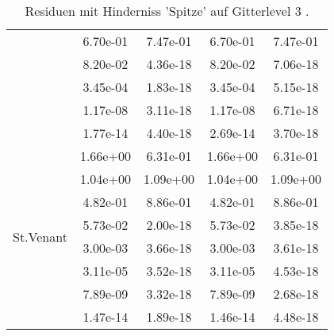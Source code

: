 \begin{table}
\begin{tabular}{c|cc|cc|}
\multicolumn{1}{|c|}{} & \multicolumn{1}{|c|}{  6.70e-01} & \multicolumn{1}{|c|}{  7.47e-01} & \multicolumn{1}{|c|}{  6.70e-01} & \multicolumn{1}{|c|}{  7.47e-01} \\ 
\multicolumn{1}{|c|}{} & \multicolumn{1}{|c|}{  8.20e-02} & \multicolumn{1}{|c|}{  4.36e-18} & \multicolumn{1}{|c|}{  8.20e-02} & \multicolumn{1}{|c|}{  7.06e-18} \\ 
\multicolumn{1}{|c|}{} & \multicolumn{1}{|c|}{  3.45e-04} & \multicolumn{1}{|c|}{  1.83e-18} & \multicolumn{1}{|c|}{  3.45e-04} & \multicolumn{1}{|c|}{  5.15e-18} \\ 
\multicolumn{1}{|c|}{} & \multicolumn{1}{|c|}{  1.17e-08} & \multicolumn{1}{|c|}{  3.11e-18} & \multicolumn{1}{|c|}{  1.17e-08} & \multicolumn{1}{|c|}{  6.71e-18} \\ 
\multicolumn{1}{|c|}{} & \multicolumn{1}{|c|}{  1.77e-14} & \multicolumn{1}{|c|}{  4.40e-18} & \multicolumn{1}{|c|}{  2.69e-14} & \multicolumn{1}{|c|}{  3.70e-18} \\ 
\hline 
\multicolumn{1}{|c|}{\multirow{8}{*}{St.Venant}} &\multicolumn{1}{|c|}{  1.66e+00} & \multicolumn{1}{|c|}{  6.31e-01} & \multicolumn{1}{|c|}{  1.66e+00} & \multicolumn{1}{|c|}{  6.31e-01} \\ 
\multicolumn{1}{|c|}{} & \multicolumn{1}{|c|}{  1.04e+00} & \multicolumn{1}{|c|}{  1.09e+00} & \multicolumn{1}{|c|}{  1.04e+00} & \multicolumn{1}{|c|}{  1.09e+00} \\ 
\multicolumn{1}{|c|}{} & \multicolumn{1}{|c|}{  4.82e-01} & \multicolumn{1}{|c|}{  8.86e-01} & \multicolumn{1}{|c|}{  4.82e-01} & \multicolumn{1}{|c|}{  8.86e-01} \\ 
\multicolumn{1}{|c|}{} & \multicolumn{1}{|c|}{  5.73e-02} & \multicolumn{1}{|c|}{  2.00e-18} & \multicolumn{1}{|c|}{  5.73e-02} & \multicolumn{1}{|c|}{  3.85e-18} \\ 
\multicolumn{1}{|c|}{} & \multicolumn{1}{|c|}{  3.00e-03} & \multicolumn{1}{|c|}{  3.66e-18} & \multicolumn{1}{|c|}{  3.00e-03} & \multicolumn{1}{|c|}{  3.61e-18} \\ 
\multicolumn{1}{|c|}{} & \multicolumn{1}{|c|}{  3.11e-05} & \multicolumn{1}{|c|}{  3.52e-18} & \multicolumn{1}{|c|}{  3.11e-05} & \multicolumn{1}{|c|}{  4.53e-18} \\ 
\multicolumn{1}{|c|}{} & \multicolumn{1}{|c|}{  7.89e-09} & \multicolumn{1}{|c|}{  3.32e-18} & \multicolumn{1}{|c|}{  7.89e-09} & \multicolumn{1}{|c|}{  2.68e-18} \\ 
\multicolumn{1}{|c|}{} & \multicolumn{1}{|c|}{  1.47e-14} & \multicolumn{1}{|c|}{  1.89e-18} & \multicolumn{1}{|c|}{  1.46e-14} & \multicolumn{1}{|c|}{  4.48e-18} \\ 
\hline 
\end{tabular}\caption{Residuen mit Hinderniss 'Spitze' auf Gitterlevel 3 .}\label{tab:Residuum_Spitze_level3}
\end{table} 
